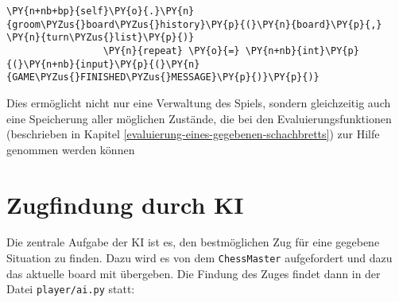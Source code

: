 \begin{Verbatim}[commandchars=\\\{\}]
                 \PY{n+nb+bp}{self}\PY{o}{.}\PY{n}{groom\PYZus{}board\PYZus{}history}\PY{p}{(}\PY{n}{board}\PY{p}{,} \PY{n}{turn\PYZus{}list}\PY{p}{)}
                 \PY{n}{repeat} \PY{o}{=} \PY{n+nb}{int}\PY{p}{(}\PY{n+nb}{input}\PY{p}{(}\PY{n}{GAME\PYZus{}FINISHED\PYZus{}MESSAGE}\PY{p}{)}\PY{p}{)}
\end{Verbatim}

    Dies ermöglicht nicht nur eine Verwaltung des Spiels, sondern
gleichzeitig auch eine Speicherung aller möglichen Zustände, die bei den
Evaluierungsfunktionen (beschrieben in Kapitel \ref{evaluierung-eines-gegebenen-schachbretts}) zur Hilfe genommen werden können

    \section{Zugfindung durch KI}\label{zugfindung-durch-ki}

Die zentrale Aufgabe der KI ist es, den bestmöglichen Zug für eine
gegebene Situation zu finden. Dazu wird es
von dem \texttt{ChessMaster} aufgefordert und dazu das aktuelle
board mit übergeben. Die Findung des Zuges findet dann in der Datei
\texttt{player/ai.py} statt:

